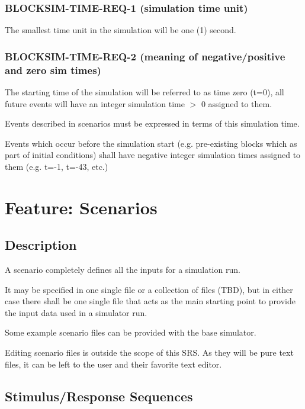 \documentclass{scrreprt}
\begin{document}
      \subsubsection{BLOCKSIM-TIME-REQ-1 (simulation time unit)}

        The smallest time unit in the simulation will be one (1) second.

      \subsubsection{BLOCKSIM-TIME-REQ-2 (meaning of negative/positive and zero sim times)}

        The starting time of the simulation will be referred to as time zero
        (t=0), all future events will have an integer simulation time $>$ 0
        assigned to them.

        Events described in scenarios must be expressed in terms of this
        simulation time.

        Events which occur before the simulation start (e.g. pre-existing
        blocks which as part of initial conditions) shall have negative
        integer simulation times assigned to them (e.g. t=-1, t=-43, etc.)

  \section{Feature: Scenarios}

    \subsection{Description}

      A scenario completely defines all the inputs for a simulation run.

      It may be specified in one single file or a collection of files (TBD),
      but in either case there shall be one single file that acts as the
      main starting point to provide the input data used in a simulator run.

      Some example scenario files can be provided with the base simulator.

      Editing scenario files is outside the scope of this SRS.
      As they will be pure text files, it can be left to the user and
      their favorite text editor.

    \subsection{Stimulus/Response Sequences}
\end{document}
